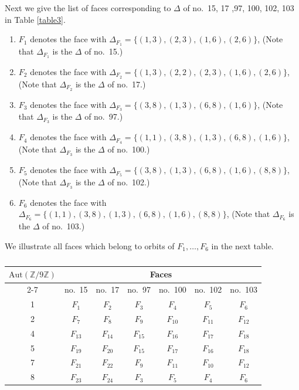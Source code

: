 \documentclass{amsart}
\theoremstyle{plain}
\theoremstyle{definition}
\numberwithin{theorem}{section}
\numberwithin{equation}{section}
\numberwithin{equation}{theorem}
\begin{document}
Next we give the list of faces corresponding to $\Delta$ of no.\ 15, 17 ,97, 100, 102, 103 in Table \ref{table3}.
\begin{enumerate}
\item $F_1$ denotes the face with $\Delta_{F_1}=\{(1,3),(2,3),(1,6),(2,6)\}$, (Note that $\Delta_{F_1}$ is the $\Delta$ of no.\  15.)
\item $F_2$ denotes the face with $\Delta_{F_2}=\{(1,3),(2,2),(2,3),(1,6),(2,6)\}$, (Note that $\Delta_{F_2}$ is the $\Delta$ of no.\ 17.)
\item $F_3$ denotes the face with
$\Delta_{F_3}=\{(3,8),(1,3),(6,8),(1,6)\}$, (Note that $\Delta_{F_3}$ is the $\Delta$ of no.\ 97.)
\item $F_4$ denotes the face with
$\Delta_{F_4}=\{(1,1),(3,8),(1,3),(6,8),(1,6)\}$, (Note that $\Delta_{F_3}$ is the $\Delta$ of no.\ 100.)
\item $F_5$ denotes the face with
$\Delta_{F_5}=\{(3,8),(1,3),(6,8),(1,6),(8,8)\}$, (Note that $\Delta_{F_3}$ is the $\Delta$ of no.\ 102.)
\item $F_6$ denotes the face with
$\Delta_{F_6}=\{(1,1),(3,8),(1,3),(6,8),(1,6),(8,8)\}$, (Note that $\Delta_{F_6}$ is the $\Delta$ of no.\ 103.)
\end{enumerate}

We illustrate all faces which belong to orbits of $F_1,\dots,F_6$ in the next table.

\begin{table}[h]
\caption{}
\label{table4}
\begin{tabular}{|c|c|c|c|c|c|c|}\hline
\multirow{2}{*}{$\mathrm{Aut}(\mathbb{Z}/9\mathbb{Z})$} & \multicolumn{6}{|c|}{Faces}\\
\cline{2-7}
{}
& no.\ 15 & no.\ 17 & no.\ 97 & no.\ 100 & no.\ 102 & no.\ 103\\
\hline
1 & $F_1$ & $F_2$ & $F_3$ & $F_4$ & $F_5$ & $F_6$ \\
\hline
2 & $F_7$ & $F_8$ & $F_9$ & $F_{10}$ & $F_{11}$ & $F_{12}$\\
\hline
4 & $F_{13}$ & $F_{14}$ & $F_{15}$ & $F_{16}$ & $F_{17}$ & $F_{18}$\\
\hline
5 & $F_{19}$ & $F_{20}$ & $F_{15}$ & $F_{17}$ & $F_{16}$ & $F_{18}$\\
\hline
7 & $F_{21}$ & $F_{22}$ & $F_{9}$ & $F_{11}$ & $F_{10}$ & $F_{12}$\\
\hline
8 & $F_{23}$ & $F_{24}$ & $F_3$ & $F_5$ & $F_4$ & $F_6$\\
\hline
\end{tabular}
\end{table}
\end{document}
